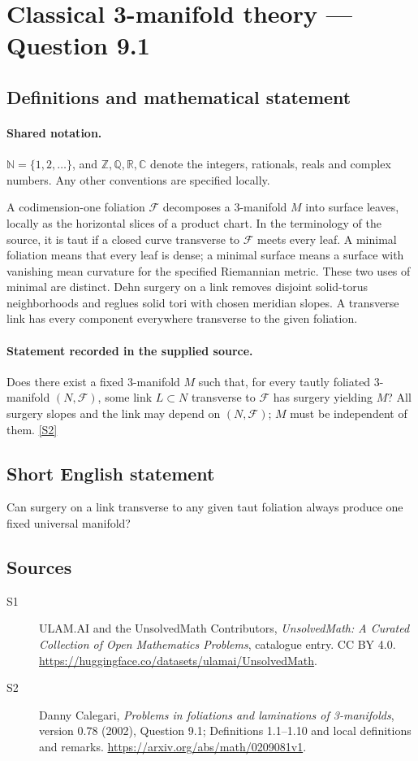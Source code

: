 \documentclass[11pt]{article}
\newcommand{\sref}[2]{\hyperlink{source:#1:#2}{[S#2]}}
\begin{document}
\section{Classical 3-manifold theory — Question 9.1}\label{statement}

\subsection{Definitions and mathematical statement}

\paragraph{Shared notation.}$\mathbb N=\{1,2,\ldots\}$, and $\mathbb Z,\mathbb Q,\mathbb R,\mathbb C$ denote the integers, rationals, reals and complex numbers. Any other conventions are specified locally.


A codimension-one foliation $\mathcal F$ decomposes a $3$-manifold $M$ into surface leaves, locally as the horizontal slices of a product chart. In the terminology of the source, it is taut if a closed curve transverse to $\mathcal F$ meets every leaf. A minimal foliation means that every leaf is dense; a minimal surface means a surface with vanishing mean curvature for the specified Riemannian metric. These two uses of minimal are distinct. Dehn surgery on a link removes disjoint solid-torus neighborhoods and reglues solid tori with chosen meridian slopes. A transverse link has every component everywhere transverse to the given foliation.
\paragraph{Statement recorded in the supplied source.}
Does there exist a fixed $3$-manifold $M$ such that, for every tautly foliated $3$-manifold $(N,\mathcal F)$, some link $L\subset N$ transverse to $\mathcal F$ has surgery yielding $M$? All surgery slopes and the link may depend on $(N,\mathcal F)$; $M$ must be independent of them. \sref{statement}{2}
\subsection{Short English statement}
Can surgery on a link transverse to any given taut foliation always produce one fixed universal manifold?
\subsection{Sources}
\begin{description}
\item[\hypertarget{source:statement:1}{S1}] ULAM.AI and the UnsolvedMath Contributors, \emph{UnsolvedMath: A Curated Collection of Open Mathematics Problems}, catalogue entry. CC BY 4.0. \url{https://huggingface.co/datasets/ulamai/UnsolvedMath}.
\item[\hypertarget{source:statement:2}{S2}] Danny Calegari, \emph{Problems in foliations and laminations of 3-manifolds}, version 0.78 (2002), Question 9.1; Definitions 1.1--1.10 and local definitions and remarks. \url{https://arxiv.org/abs/math/0209081v1}.
\end{description}
\label{end:statement}
\end{document}
